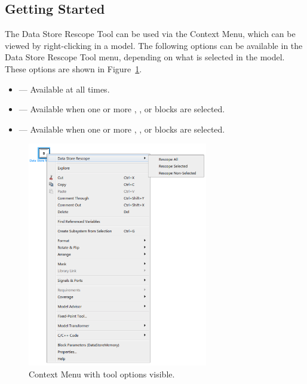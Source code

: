 \documentclass{article}
\makeatletter
\newcommand{\ToolName}{Data Store Rescope Tool\@\xspace}
\newcommand{\menu}[2]{%
	\ifthenelse{\equal{#1}{1}}{Rescope All}{}%
  	\ifthenelse{\equal{#1}{2}}{Rescope Selected}{}%
  	\ifthenelse{\equal{#1}{3}}{Rescope Non-Selected}{}%
}
\makeatother
\begin{document}
\subsection{Getting Started}
The \ToolName can be used via the \Simulink Context Menu, which can be viewed by right-clicking in a model. The following options can be available in the \ToolName menu, depending on what is selected in the model. These options are shown in Figure~\ref{FIG:contextMenu}.
\begin{itemize}
	\item \emph{} --- Available at all times.
	\item \emph{} --- Available when one or more \DSM, \DSR, or \DSW blocks are selected.
	\item \emph{} --- Available when one or more \DSM, \DSR, or \DSW blocks are selected.
\end{itemize}

\begin{figure}[htb]
	\centering
	\includegraphics[width=0.7\textwidth]{../figs/ContextMenu}
	\caption{\Simulink Context Menu with tool options visible.}
	\label{FIG:contextMenu}
\end{figure}

\newpage
\end{document}
